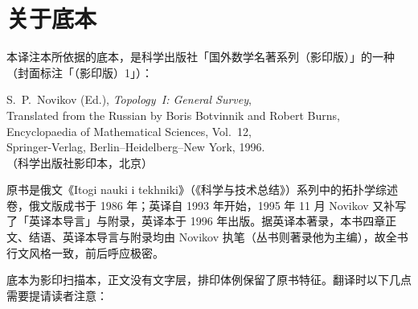\chapter*{关于底本}

本译注本所依据的底本，是科学出版社「国外数学名著系列（影印版）」的一种（封面标注「（影印版）1」）：

\begin{center}
\small
S.~P.~Novikov (Ed.), \emph{Topology~I: General Survey},\\
Translated from the Russian by Boris Botvinnik and Robert Burns,\\
Encyclopaedia of Mathematical Sciences, Vol.~12,\\
Springer-Verlag, Berlin--Heidelberg--New York, 1996.\\
（科学出版社影印本，北京）
\end{center}

原书是俄文《Itogi nauki i tekhniki》（《科学与技术总结》）系列中的拓扑学综述卷，俄文版成书于 1986 年；英译自 1993 年开始，1995 年 11 月 Novikov 又补写了「英译本导言」与附录，英译本于 1996 年出版。据英译本著录，本书四章正文、结语、英译本导言与附录均由 Novikov 执笔（丛书则著录他为主编），故全书行文风格一致，前后呼应极密。

底本为影印扫描本，正文没有文字层，排印体例保留了原书特征。翻译时以下几点需要提请读者注意：

